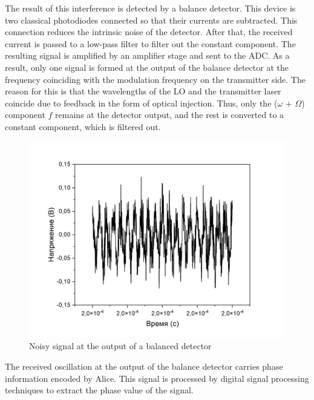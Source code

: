 {\newline The result of this interference is detected by a balance detector. This device is two classical photodiodes connected so that their currents are subtracted. This connection reduces the intrinsic noise of the detector. After that, the received current is passed to a low-pass filter to filter out the constant component. The resulting signal is amplified by an amplifier stage and sent to the ADC.  As a result, only one signal is formed at the output of the balance detector at the frequency coinciding with the modulation frequency on the transmitter side. The reason for this is that the wavelengths of the LO and the transmitter laser coincide due to feedback in the form of optical injection. Thus, only the ($\omega$ + $\Omega$) component $f$ remains at the detector output, and the rest is converted to a constant component, which is filtered out. 
\begin{figure}
    \centering
    \includegraphics[width=\textwidth]{images/03.png}
    \caption{Noisy signal at the output of a balanced detector}
    \label{fig:noisy output inject syn}
\end{figure}
The received oscillation at the output of the balance detector carries phase information encoded by Alice. This signal is processed by digital signal processing techniques to extract the phase value of the signal. 
\begin{figure}
    \centering

\end{figure}}
